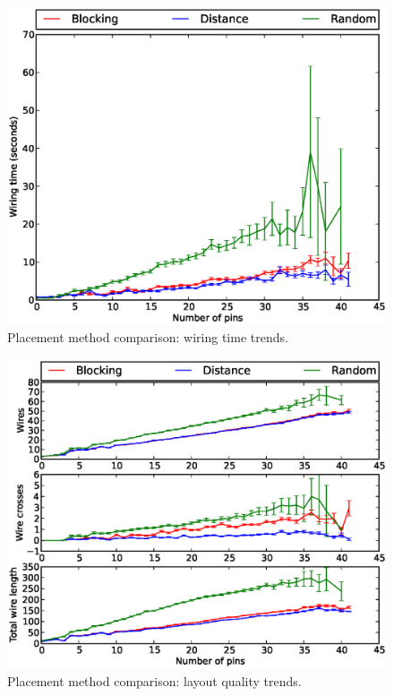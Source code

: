 \begin{figure}[H]
\begin{center}
\includegraphics[width=\textwidth]{Images/placement_time_trend_comparison.eps}
\caption{Placement method comparison: wiring time trends.}
\label{fig:placement_time_trend}
\end{center}
\end{figure}

\begin{figure}
\begin{center}
\includegraphics[width=\textwidth]{Images/placement_quality_trend_comparison.eps}
\caption{Placement method comparison: layout quality trends.}
\label{fig:placement_quality_trend}
\end{center}
\end{figure}

